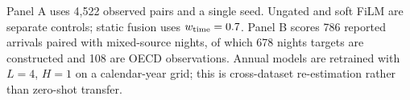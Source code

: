 \begin{table}[!t]
\begin{minipage}[t]{0.49\textwidth}
\end{minipage}
\par\vspace{3pt}
\begin{minipage}{\textwidth}
\scriptsize\raggedright Panel A uses 4,522 observed pairs and a single seed. Ungated and soft FiLM are separate controls; static fusion uses $w_{\rm time}=0.7$. Panel B scores 786 reported arrivals paired with mixed-source nights, of which 678 nights targets are constructed and 108 are OECD observations. Annual models are retrained with $L=4$, $H=1$ on a calendar-year grid; this is cross-dataset re-estimation rather than zero-shot transfer.
\end{minipage}
\end{table}
